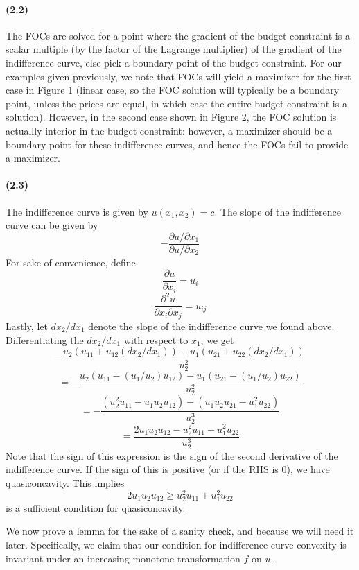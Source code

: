 \documentclass[10pt,letter]{article}
\begin{document}
\paragraph{(2.2)}
The FOCs are solved for a point where the gradient of the budget constraint is a scalar multiple (by the factor of the Lagrange multiplier) of the gradient of the indifference curve, else pick a boundary point of the budget constraint. For our examples given previously, we note that FOCs will yield a maximizer for the first case in Figure 1 (linear case, so the FOC solution will typically be a boundary point, unless the prices are equal, in which case the entire budget constraint is a solution). However, in the second case shown in Figure 2, the FOC solution is actuallly interior in the budget constraint: however, a maximizer should be a boundary point for these indifference curves, and hence the FOCs fail to provide a maximizer.
\paragraph{(2.3)}
The indifference curve is given by $u(x_1, x_2) = c$. The slope of the indifference curve can be given by
\[ - \frac{\partial u / \partial x_1}{ \partial u / \partial x_2} \]
For sake of convenience, define
\[ \frac{\partial u}{\partial x_i} = u_i \]
\[ \frac{\partial^2 u}{\partial x_i \partial x_j} = u_{ij} \]
Lastly, let $dx_2/dx_1$ denote the slope of the indifference curve we found above. Differentiating the $dx_2/dx_1$ with respect to $x_1$, we get
\[ - \frac{u_2 \left(u_{11} + u_{12} (dx_2/dx_1) \right) - u_1 \left( u_{21} + u_{22}(dx_2/dx_1) \right) }{u_2^2} \]
\[ =- \frac{u_2 \left(u_{11} - (u_1/u_2) u_{12}\right) - u_1 \left( u_{21} - (u_1/u_2)u_{22} \right) }{u_2^2} \]
\[=-\frac{\left(u_2^2u_{11} - u_1 u_2 u_{12}\right) - \left( u_1 u_2 u_{21} - u_1^2 u_{22} \right) }{u_2^3}\]
\[=\frac{2u_1u_2u_{12} - u_2^2u_{11} - u_1^2 u_{22} }{u_2^3}\]
Note that the sign of this expression is the sign of the second derivative of the indifference curve. If the sign of this is positive (or if the RHS is 0), we have quasiconcavity. This implies
\[ 2 u_1 u_2 u_{12} \ge u_2^2 u_{11} + u_1^2 u_{22} \]
is a sufficient condition for quasiconcavity.

We now prove a lemma for the sake of a sanity check, and because we will need it later. Specifically, we claim that our condition for indifference curve convexity is invariant under an increasing monotone transformation $f$ on $u$.
\end{document}

